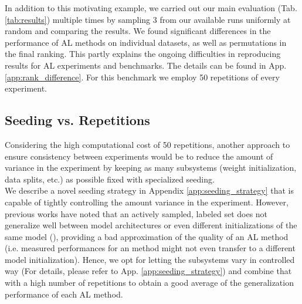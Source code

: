 \documentclass[]{article}
\begin{document}
In addition to this motivating example, we carried out our main evaluation (Tab. \ref{tab:results}) multiple times by sampling 3 from our available runs uniformly at random and comparing the results.
We found significant differences in the performance of AL methods on individual datasets, as well as permutations in the final ranking.
This partly explains the ongoing difficulties in reproducing results for AL experiments and benchmarks.
The details can be found in App. \ref{app:rank_difference}.
For this benchmark we employ 50 repetitions of every experiment.


\subsection{Seeding vs. Repetitions}\label{sec:reproducibility}
Considering the high computational cost of 50 repetitions, another approach to ensure consistency between experiments would be to reduce the amount of variance in the experiment by keeping as many subsystems (weight initialization, data splits, etc.) as possible fixed with specialized seeding. \\
We describe a novel seeding strategy in Appendix \ref{app:seeding_strategy} that is capable of tightly controlling the amount variance in the experiment.
However, previous works have noted that an actively sampled, labeled set does not generalize well between model architectures or even different initializations of the same model (\cite{zhou2021towards, lowell2018practical}), providing a bad approximation of the quality of an AL method (i.e. measured performances for an method might not even transfer to a different model initialization).
Hence, we opt for letting the subsystems vary in controlled way (For details, please refer to App. \ref{app:seeding_strategy}) and combine that with a high number of repetitions to obtain a good average of the generalization performance of each AL method. 


\end{document}
